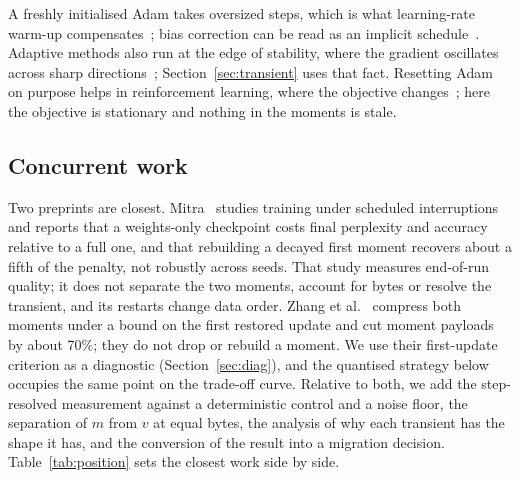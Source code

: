 A freshly initialised Adam takes oversized steps, which is what learning-rate warm-up
compensates~\cite{liu2020radam,ma2021untunedwarmup,kalra2024warmup}; bias correction can be read as an implicit
schedule~\cite{laing2025biascorrection}. Adaptive methods also run at the edge of stability, where the gradient
oscillates across sharp directions~\cite{cohen2022aeos}; Section~\ref{sec:transient} uses that fact. Resetting Adam on
purpose helps in reinforcement learning, where the objective changes~\cite{asadi2023resetting}; here the objective is
stationary and nothing in the moments is stale.

\subsection{Concurrent work}

Two preprints are closest. Mitra~\cite{mitra2026orbittrace} studies training under scheduled interruptions and reports
that a weights-only checkpoint costs final perplexity and accuracy relative to a full one, and that rebuilding a decayed
first moment recovers about a fifth of the penalty, not robustly across seeds. That study measures end-of-run quality;
it does not separate the two moments, account for bytes or resolve the transient, and its restarts change data order.
Zhang et al.~\cite{zhang2026guarded} compress both moments under a bound on the first restored update and cut moment
payloads by about 70\%; they do not drop or rebuild a moment. We use their first-update criterion as a
diagnostic (Section~\ref{sec:diag}), and the quantised strategy below occupies the same point on the trade-off curve.
Relative to both, we add the step-resolved measurement against a deterministic control and a noise
floor, the separation of $m$ from $v$ at equal bytes, the analysis of why each transient has the shape it has, and the
conversion of the result into a migration decision. Table~\ref{tab:position} sets the closest work side by side.

